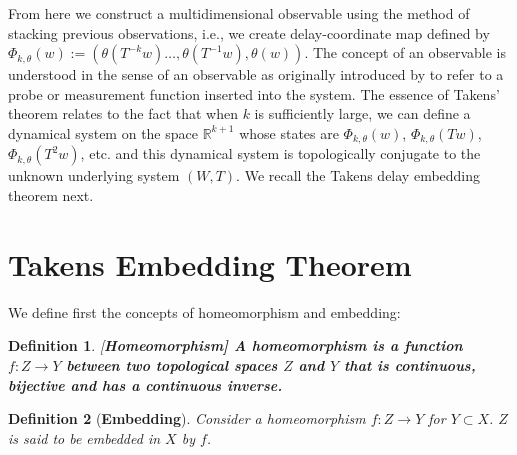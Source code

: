 \documentclass[a4paper,12pt,twoside]{report}
\newtheorem{Definition}{Definition}[]
\begin{document}
From here we construct a multidimensional observable using the method of stacking previous observations, i.e., we create delay-coordinate map defined by
$\Phi_{k,\theta}(w) := (\theta(T^{-k}w)\ldots,\theta(T^{-1}w),\theta(w))$.  
The concept of an observable is understood in the sense of an observable as originally introduced by \cite{takens1981detecting, genericObservableAeyels} to refer to a probe or measurement function inserted into the system. 
The essence of Takens' theorem relates to the fact that when $k$ is sufficiently large, we can define a dynamical system on the space $\mathbb{R}^{k+1}$ whose states are $\Phi_{k,\theta}(w)$, $\Phi_{k,\theta}(Tw)$, $\Phi_{k,\theta}(T^2w)$, etc. and this dynamical system is topologically conjugate to the unknown underlying system $(W,T)$. We recall the Takens delay embedding theorem next.



\section{Takens Embedding Theorem}\label{sect_Takens}

We define first the concepts of homeomorphism and embedding:
\begin{Definition}\rm
  [\bf {Homeomorphism}]\label{Dfn_homeo}\rm
  A homeomorphism is a function $f:Z\rightarrow Y$ between two topological spaces $Z$ and $Y$ that is continuous, bijective and has a continuous inverse. 
\end{Definition}

\begin{Definition}
  [\bf {Embedding}]\label{Dfn_embed}\rm
  Consider a homeomorphism $f:Z\rightarrow Y$ for $Y\subset X$. $Z$ is said to be embedded in $X$ by $f$.
\end{Definition}
\end{document}
